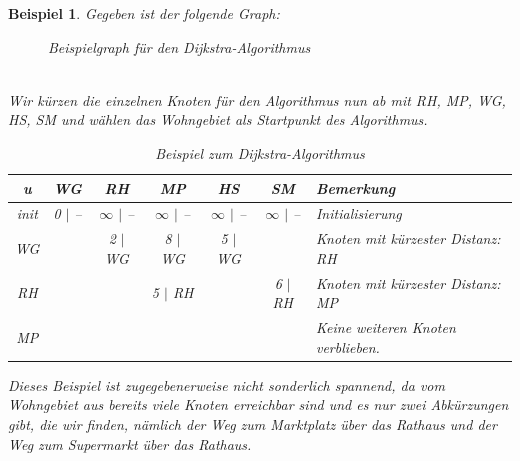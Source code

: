\documentclass[11pt,a4paper]{scrartcl}
\newtheorem{example}{Beispiel}
\begin{document}
\begin{example}
Gegeben ist der folgende Graph:
\begin{figure}[h]
\centering
{}
\caption{Beispielgraph für den Dijkstra-Algorithmus}
\end{figure} \\
Wir kürzen die einzelnen Knoten für den Algorithmus nun ab mit RH, MP, WG, HS, SM und wählen das Wohngebiet als Startpunkt des Algorithmus. \\
\begin{table}[h]
\centering
\begin{tabular}{|c|c|c|c|c|c|l|}
\hline
u    & WG     & RH            & MP            & HS            & SM            & Bemerkung \\
\hline
init & 0 $\mid$ -- & $\infty$ $\mid$ -- & $\infty$ $\mid$ -- & $\infty$ $\mid$ -- & $\infty$ $\mid$ -- & Initialisierung \\
\hline
WG   &        & 2 $\mid$ WG   & 8 $\mid$ WG        & 5 $\mid$ WG        &               & Knoten mit kürzester Distanz: RH\\
\hline
RH   &        &               & 5 $\mid$ RH   	     &               & 6 $\mid$ RH        & Knoten mit kürzester Distanz: MP \\
\hline
MP   &        &               &               &               &               & Keine weiteren Knoten verblieben. \\
\hline
\end{tabular}
\caption{Beispiel zum Dijkstra-Algorithmus}
\end{table} 
Dieses Beispiel ist zugegebenerweise nicht sonderlich spannend, da vom Wohngebiet aus bereits viele Knoten erreichbar sind und es nur zwei Abkürzungen gibt, die wir finden, nämlich der Weg zum Marktplatz über das Rathaus und der Weg zum Supermarkt über das Rathaus. \\\\

\end{example}
\end{document}
